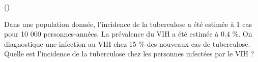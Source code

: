 \begin{exercice}\label{exo3-18} (\coolexo)

Dans une population donn\'ee, l'incidence de la tuberculose a \'et\'e estim\'ee \`a 1 cas pour
10 000 personnes-ann\'ees. La pr\'evalence du VIH a \'et\'e estim\'ee \`a 0.4  \%.
On diagnostique une infection au VIH chez 15 \% des nouveaux cas de tuberculose.
Quelle est l'incidence de la tuberculose chez les personnes infect\'ees par le VIH ?\\

\end{exercice}

